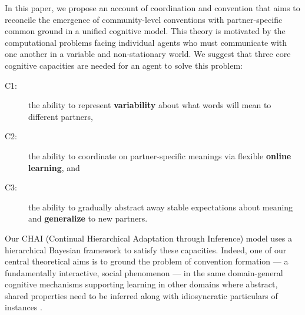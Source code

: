 In this paper, we propose an account of coordination and convention that aims to reconcile the emergence of community-level conventions with partner-specific common ground in a unified cognitive model.
This theory is motivated by the computational problems facing individual agents who must communicate with one another in a variable and non-stationary world. 
We suggest that three core cognitive capacities are needed for an agent to solve this problem:
\begin{description}
\item[C1:] the ability to represent \textbf{variability} about what words will mean to different partners,
\item[C2:] the ability to coordinate on partner-specific meanings via flexible  \textbf{online learning}, and
\item[C3:] the ability to gradually abstract away stable expectations about meaning and \textbf{generalize} to new partners.
\end{description}
Our CHAI (Continual Hierarchical Adaptation through Inference) model uses a hierarchical Bayesian framework to satisfy these capacities.
Indeed, one of our central theoretical aims is to ground the problem of convention formation --- a fundamentally interactive, social phenomenon --- in the same domain-general cognitive mechanisms supporting learning in other domains where abstract, shared properties need to be inferred along with idiosyncratic particulars of instances \cite{berniker2008estimating,GoodmanUllmanTenenbaum11_TheoryOfCausality,tenenbaum_how_2011,kleinschmidt2015robust}.

